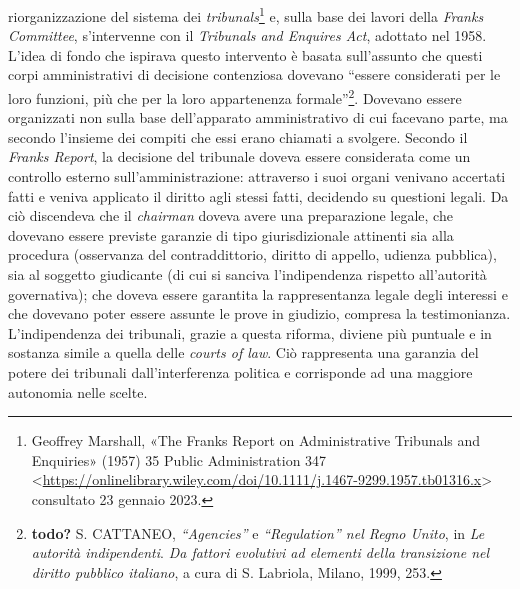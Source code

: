 \documentclass[12pt,it,a4paper,]{report}
\begin{document}
riorganizzazione del sistema dei \emph{tribunals}\footnote{{Geoffrey
  Marshall, {«The Franks Report on Administrative Tribunals and
  Enquiries»} (1957) 35 Public Administration 347
  \textless{}\url{https://onlinelibrary.wiley.com/doi/10.1111/j.1467-9299.1957.tb01316.x}\textgreater{}
  consultato 23 gennaio 2023.}} e, sulla base dei lavori della
\emph{Franks Committee}, s'intervenne con il \emph{Tribunals and
Enquires Act}, adottato nel 1958. L'idea di fondo che ispirava questo
intervento è basata sull'assunto che questi corpi amministrativi di
decisione contenziosa dovevano ``essere considerati per le loro
funzioni, più che per la loro appartenenza formale''\footnote{\textbf{todo?}
  S. CATTANEO, \emph{``Agencies''} e \emph{``Regulation'' nel Regno
  Unito}, in \emph{Le autorità indipendenti}. \emph{Da fattori evolutivi
  ad elementi della transizione nel diritto pubblico italiano}, a cura
  di S. Labriola, Milano, 1999, 253.}. Dovevano essere organizzati non
sulla base dell'apparato amministrativo di cui facevano parte, ma
secondo l'insieme dei compiti che essi erano chiamati a svolgere.
Secondo il \emph{Franks Report}, la decisione del tribunale doveva
essere considerata come un controllo esterno sull'amministrazione:
attraverso i suoi organi venivano accertati fatti e veniva applicato il
diritto agli stessi fatti, decidendo su questioni legali. Da ciò
discendeva che il \emph{chairman} doveva avere una preparazione legale,
che dovevano essere previste garanzie di tipo giurisdizionale attinenti
sia alla procedura (osservanza del contraddittorio, diritto di appello,
udienza pubblica), sia al soggetto giudicante (di cui si sanciva
l'indipendenza rispetto all'autorità governativa); che doveva essere
garantita la rappresentanza legale degli interessi e che dovevano poter
essere assunte le prove in giudizio, compresa la testimonianza.
L'indipendenza dei tribunali, grazie a questa riforma, diviene più
puntuale e in sostanza simile a quella delle \emph{courts of law}. Ciò
rappresenta una garanzia del potere dei tribunali dall'interferenza
politica e corrisponde ad una maggiore autonomia nelle scelte.
\end{document}
